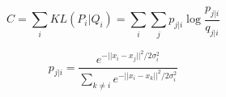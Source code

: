 \documentclass[11pt]{article}
\author{NovaCrystalis-Chibi}
\date{\today}
\title{}
\begin{document}
\tableofcontents

\[
 C = \sum_i {KL(P_i | Q_i)} = \sum_i \sum_j {p_{j|i} \log{\frac{p_{j|i}}{q_{j|i}}}} 
\]


\[
 p_{j|i} = \frac{e^{-||x_i-x_j||^2 / 2 \sigma_i^2 }}{\sum_{k \neq i} e^{-||x_i-x_k||^2 / 2 \sigma_i^2}}
\]
\end{document}
